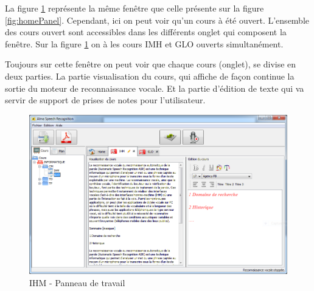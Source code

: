 La figure \ref{fig:workPanel} représente la même fenêtre que celle présente sur la figure \ref{fig:homePanel}. Cependant, ici on peut voir qu'un cours à été ouvert. L'ensemble des cours ouvert sont accessibles dans les différents onglet qui composent la fenêtre. Sur la figure \ref{fig:workPanel} on à les cours IMH et GLO ouverts simultanément.

Toujours sur cette fenêtre on peut voir que chaque cours (onglet), se divise en deux parties. La partie visualisation du cours, qui affiche de façon continue la sortie du moteur de reconnaissance vocale. Et la partie d'édition de texte qui va servir de support de prises de notes pour l'utilisateur. 


\begin{figure}[H]
 \centering
 \includegraphics[scale=0.6]{./images/workPanel.png}
 \caption{IHM - Panneau de travail}
 \label{fig:workPanel}
\end{figure}



